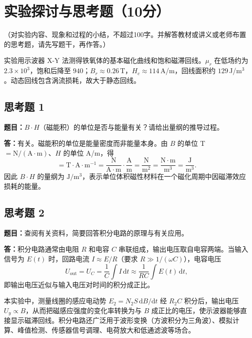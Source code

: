 \documentclass{Phyport}
\begin{document}
\section{实验探讨与思考题（10分）}
（对实验内容、现象和过程的小结，不超过100字。并解答教材或讲义或老师布置的思考题，请先写题干，再作答。）

实验用示波器 X-Y 法测得铁氧体的基本磁化曲线和饱和磁滞回线。$\mu_r$ 在低场约为 $2.3\times10^{3}$，饱和后降至 $940$；$B_r\approx0.26$\,T，$H_c\approx114$\,A/m，回线面积约 $129$\,J/m$^3$。动态回线包含涡流损耗，故大于静态回线。

\subsection*{思考题 1}
\textbf{题目：}$B\cdot H$（磁能积）的单位是否与能量有关？请给出量纲的推导过程。

\textbf{答：}有关。磁能积的单位是能量密度而非能量本身。由 $B$ 的单位 T $=\mathrm{N/(A\cdot m)}$、$H$ 的单位 A/m，得
\begin{equation*}
    [B\cdot H]=\mathrm{T\cdot A\cdot m^{-1}}
    =\frac{\mathrm{N}}{\mathrm{A\cdot m}}\cdot\frac{\mathrm{A}}{\mathrm{m}}
    =\frac{\mathrm{N}}{\mathrm{m^2}}
    =\frac{\mathrm{N\cdot m}}{\mathrm{m^3}}
    =\frac{\mathrm{J}}{\mathrm{m^3}}.
\end{equation*}
因此 $B\cdot H$ 的量纲为 $\mathrm{J/m^3}$，表示单位体积磁性材料在一个磁化周期中因磁滞效应损耗的能量。

\subsection*{思考题 2}
\textbf{题目：}查阅有关资料，简要回答积分电路的原理与有关应用。

\textbf{答：}积分电路通常由电阻 $R$ 和电容 $C$ 串联组成，输出电压取自电容两端。当输入信号为 $E(t)$ 时，回路电流 $I\approx E/R$（要求 $R\gg1/(\omega C)$），电容电压
\begin{equation*}
    U_{\mathrm{out}}=U_C=\frac{1}{C}\int I\,\mathrm{d}t\approx\frac{1}{RC}\int E(t)\,\mathrm{d}t,
\end{equation*}
即输出电压近似与输入电压对时间的积分成正比。

本实验中，测量线圈的感应电动势 $E_2=N_2S\,\mathrm{d}B/\mathrm{d}t$ 经 $R_2C$ 积分后，输出电压 $U_y\propto B$，从而把磁感应强度的变化率转换为与 $B$ 成正比的电压，使示波器能够直接显示磁滞回线。积分电路还广泛用于波形变换（方波积分为三角波）、模拟计算、峰值检测、传感器信号调理、电荷放大和低通滤波等场合。
\end{document}
